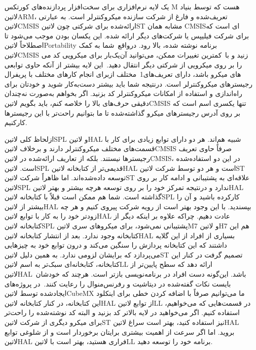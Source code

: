 یک لایه نرم‌افزاری برای سخت‌افزار پردازنده‌های کورتکس M هست که توسط بنیاد ‌لاتین{ARM}، تعریف‌شده و فارغ از شرکت سازنده میکروکنترلر است. به عبارتی ‌لاتین{CMSIS} ارائه‌شده برای شرکتی چون ‌لاتین{ST} مشابه همان CMSISای است که برای شرکت فیلیپس یا شرکت‌های دیگر ارائه شده. این یکسان بودن موجب می‌شود تا اصطلاحاً ‌لاتین{Portability} برنامه نوشته شده، بالا رود.
درواقع شما به کمک ‌لاتین{CMSIS} یک‌بار برای میکرویی کد می‎‌زنید و با کمترین تغییرات ممکن، می‌توانید آن را بر روی میکرویی از شرکتی دیگر انتقال دهید. این لایه بیشتر از آنکه حاوی توابعی برای انجام کارهای مختلف با پریفرال‎‌های میکرو باشد، دارای تعریف‌های1 مختلف از رجیسترهای میکروکنترلر است. درنتیجه شما باید بیشتر دست‌به‌کار شوید و خودتان برای راه‌اندازی و استفاده از امکانات میکروکنترلر کد بزنید.
اگر بخواهم به‌صورت نه‌چندان دقیقی حرف‌های بالا را خلاصه کنم، باید بگویم ‌لاتین{CMSIS} تنها یکسری اسم است که بر روی آدرس رجیسترهای میکرو گذاشته‌شده تا ما بتوانیم راحت‌تر با این رجیسترها کارکنیم.

ازلحاظ کلی ‌لاتین{SPL} و ‌لاتین{HAL} شبیه هم‌اند. هر دو دارای توابع زیادی برای کار با قسمت‌های مختلف میکروکنترلر دارند و برخلاف ‌لاتین{CMSIS} صرفاً حاوی تعریف رجیسترها نیستند. بلکه از تعاریف ارائه‌شده در ‌لاتین{CMSIS}، در این دو استفاده‌شده است. ‌لاتین{SPL} قدیمی‌تر از کتابخانه ‌لاتین{HAL} است و هر دو توسط شرکت ‌لاتین{ST} توسعه داده‌شده‌اند. اما ظاهراً شرکت ‌لاتین{ST} علاقه‌ای به پشتیبانی و ادامه کار بر روی ‌لاتین{SPL} ندارد و درنتیجه تمرکز خود را بر روی توسعه هرچه بیشتر و بهتر ‌لاتین{HAL} گذاشته است. شما هم ممکن است قبلاً با کتابخانه ‌لاتین{SPL} کارکرده باشید و آن را بیشتر از ‌لاتین{HAL} بپسندید. با این ‌وجود بهتر است از رویه شرکت پیروی کنیم و هر چه زودتر خود را به کار با توابع ‌لاتین{HAL} عادت دهیم. چراکه علاوه بر اینکه دیگر از کتابخانه ‌لاتین{SPL} پشتیبانی نمی‌شود، برای میکروهای سری ‌لاتین{M7} و ‌لاتین{H7} هم این کتابخانه وجود ندارد.
بعد از انتشار کتابخانه ‌لاتین{HAL} بسیاری از افراد از این گلایه داشتند که این کتابخانه پردازش را سنگین می‌کند و درون توابع خود به چیزهایی می‌پردازد که برایشان لزومی ندارد. به همین دلیل ‌لاتین{ST} تصمیم گرفت در کنار این کتابخانه، کتابخانه‌ای سبک‌تر به اسم ‌لاتین{LL} ارائه دهد که سطح پایین‌تر از ‌لاتین{HAL} باشد. این‌گونه دست افراد در برنامه‌نویسی بازتر است. هرچند که خودشان بایست نکات گفته‌شده در دیتاشیت و رفرنس‌منوال را رعایت کنند. در پروژه‌های ایجادشده توسط ‌لاتین{CubeMX} ما می‌توانیم صرفاً با اضافه کردن خطی برای اینکلود این کتابخانه، در کنار کتابخانه ‌لاتین{HAL} از توابع ‌لاتین{LL} در قسمت‌هایی که می‌خواهیم، استفاده کنیم. اگر می‌خواهید در لایه بالاتر کد بزنید و البته کد نوشته‌شده را راحت‌تر برای میکرو دیگری از شرکت ‌لاتین{ST} نیز استفاده کنید، بهتر است سراغ ‌لاتین{HAL} بروید. اما اگر سرعت از اهمیت بیشتری برایتان برخوردار است و از شلوغی توابع ‌لاتین{HAL} فراری هستید، بهتر است با ‌لاتین{LL} برنامه خود را توسعه دهید.

